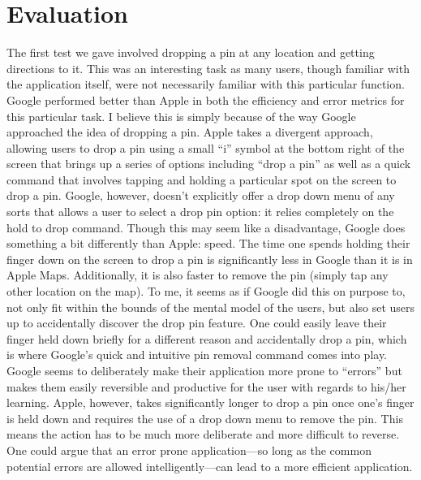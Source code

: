 \documentclass[12pt, oneside]{article}
\begin{document}
\section{Evaluation}
The first test we gave involved dropping a pin at any location and getting directions to it. This was an interesting task as many users, though familiar with the application itself, were not necessarily familiar with this particular function. Google performed better than Apple in both the efficiency and error metrics for this particular task. I believe this is simply because of the way Google approached the idea of dropping a pin. Apple takes a divergent approach, allowing users to drop a pin using a small ``i'' symbol at the bottom right of the screen that brings up a series of options including ``drop a pin'' as well as a quick command that involves tapping and holding a particular spot on the screen to drop a pin. Google, however, doesn’t explicitly offer a drop down menu of any sorts that allows a user to select a drop pin option: it relies completely on the hold to drop command. Though this may seem like a disadvantage, Google does something a bit differently than Apple: speed. The time one spends holding their finger down on the screen to drop a pin is significantly less in Google than it is in Apple Maps. %
Additionally, it is also faster to remove the pin (simply tap any other location on the map). To me, it seems as if Google did this on purpose to, not only fit within the bounds of the mental model of the users, but also set users up to accidentally discover the drop pin feature. One could easily leave their finger held down briefly for a different reason and accidentally drop a pin, which is where Google's quick and intuitive pin removal command comes into play. Google seems to deliberately make their application more prone to ``errors'' but makes them easily reversible and productive for the user with regards to his/her learning. Apple, however, takes significantly longer to drop a pin once one's finger is held down and requires the use of a drop down menu to remove the pin. This means the action has to be much more deliberate and more difficult to reverse. One could argue that an error prone application—so long as the common potential errors are allowed intelligently—can lead to a more efficient application.
\end{document}
